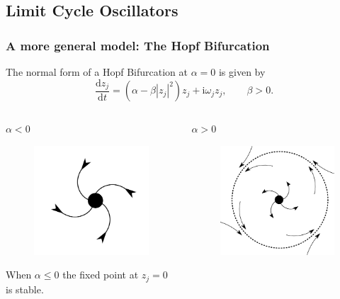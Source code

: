 \documentclass[10pt,reqno]{beamer}
\newcommand{\D}[2]{\frac{\mathrm{d} #1}{\mathrm{d} #2}}
\newcommand{\I}{\mathrm{i}}
\begin{document}
\subsection{Limit Cycle Oscillators}
\begin{frame}
\frametitle{A more general model: The Hopf Bifurcation}
The normal form of a Hopf Bifurcation at $\alpha = 0$ is given by
\[
\D{z_j}{t}= (\alpha - \beta|z_j|^2)z_j + \I\omega_j z_j, \qquad \beta >0.
\]
\begin{columns}[t]
\begin{column}{.49\textwidth}
\centering
$\alpha <0$
\begin{figure}
	\includegraphics[scale = 0.16]{node.png}
\end{figure}
When $\alpha \le 0$ the fixed point at $z_j =0$ is stable.
\end{column}
\begin{column}{.49\textwidth}
\centering
$\alpha >0$
\begin{figure}
	\includegraphics[scale = 0.16]{hopf.png}

\end{figure}
\end{column}
\end{columns}
\end{frame}
\end{document}
